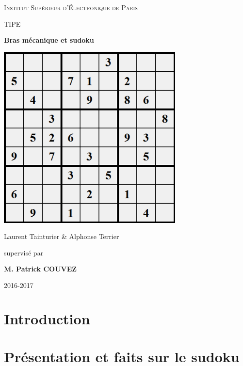 \documentclass[12pt,a4paper]{report}
\newenvironment{changemargin}[2]{\begin{list}{}{%
\setlength{\topsep}{0pt}%
\setlength{\leftmargin}{0pt}%
\setlength{\rightmargin}{0pt}%
\setlength{\listparindent}{\parindent}%
\setlength{\itemindent}{\parindent}%
\setlength{\parsep}{0pt plus 1pt}%
\addtolength{\leftmargin}{#1}%
\addtolength{\rightmargin}{#2}%
}\item }{\end{list}}
\begin{document}
\FloatBarrier

\begin{titlepage}
\begin{changemargin}{-1cm}{0cm}
	\centering
	\vspace{5cm}
	{\scshape\huge Institut Supérieur d'Électronique de Paris \par}
	\vspace{1cm}
	{\scshape\LARGE TIPE\par}
	\vspace{1.5cm}
	{\fontsize{45}{45}\selectfont\bfseries Bras mécanique et sudoku\par}
	\vspace{2cm}
	\includegraphics[width=0.7\textwidth]{../pictures/pagedegarde.png}\par\vspace{1.5cm}
	{\LARGE Laurent Tainturier \& Alphonse Terrier\par}
	\vfill
	\large supervisé par\par
	\large \bfseries M. Patrick COUVEZ

	\vfill


	{\large 2016-2017}
\end{changemargin}
\end{titlepage}

\tableofcontents
{}
	\chapter*{Introduction}
	

	\chapter{Présentation et faits sur le sudoku}
	
\end{document}
